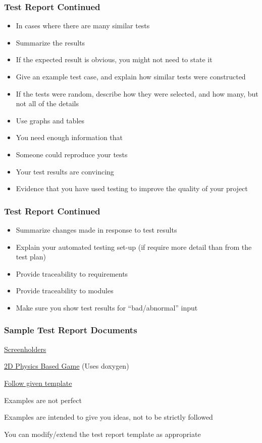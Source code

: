 \documentclass[t,12pt,numbers,fleqn]{beamer}
\begin{document}

\begin{frame}
\frametitle{Test Report Continued}
\begin{itemize}
\item In cases where there are many similar tests
\bi
\item Summarize the results
\item If the expected result is obvious, you might not need to state it
\item Give an example test case, and explain how similar tests were constructed
\item If the tests were random, describe how they were selected, and how many,
  but not all of the details
\item Use graphs and tables
\item You need enough information that
\bi
\item Someone could reproduce your tests
\item Your test results are convincing
\item Evidence that you have used testing to improve the quality of your project
\ei
\ei
\end{itemize}
\end{frame}


\begin{frame}
\frametitle{Test Report Continued}
\begin{itemize}
\item Summarize changes made in response to test results
\item Explain your automated testing set-up (if require more detail than from
  the test plan)
\item Provide traceability to requirements
\item Provide traceability to modules
\item Make sure you show test results for ``bad/abnormal'' input
\end{itemize}
\end{frame}


\begin{frame}
\frametitle{Sample Test Report Documents} 

\bi
\item
  \href{https://gitlab.cas.mcmaster.ca/screenholders/screenholders}{Screenholders}
\item
  \href{https://github.com/palmerst/CS-4ZP6/tree/master}{2D Physics Based Game}
  (Uses doxygen)
\item
  \href{https://gitlab.cas.mcmaster.ca/smiths/cas741/tree/master/BlankProjectTemplate/Doc/TestReport}{Follow given template}
\item Examples are not perfect
\item Examples are intended to give you ideas, not to be strictly followed
\item You can modify/extend the test report template as appropriate
\ei

\end{frame}
\end{document}
